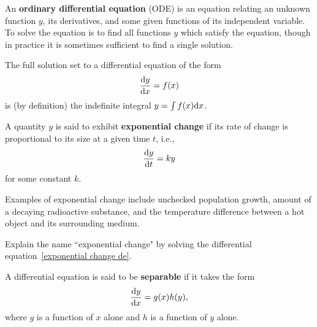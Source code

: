 

\begin{definition}
An \textbf{ordinary differential equation} (ODE) is an equation relating an unknown function $y$, its derivatives, and some given functions of its independent variable.
To solve the equation is to find all functions $y$ which satisfy the equation, though in practice it is sometimes sufficient to find a single solution.
\end{definition}

\begin{remark}
The full solution set to a differential equation of the form
\begin{equation*}
\frac{\mathrm{d} y}{\mathrm{d} x} = f(x)
\end{equation*}
is (by definition) the indefinite integral $y = \int f(x)\mathrm{d} x$.
\end{remark}

\begin{definition}
A quantity $y$ is said to exhibit \textbf{exponential change} if its rate of change is proportional to its size at a given time $t$, i.e., 
\begin{equation}\label{exponential change de}
\frac{\mathrm{d} y}{\mathrm{d} t} = ky
\end{equation}
for some constant $k$.
\end{definition}

\begin{remark}
Examples of exponential change include unchecked population growth, amount of a decaying radioactive substance, and the temperature difference between a hot object and its surrounding medium.
\end{remark}

\begin{example}
Explain the name ``exponential change" by solving the differential equation~\eqref{exponential change de}.
\end{example}

\newpage

\begin{definition}
A differential equation is said to be \textbf{separable} if it takes the form
\begin{equation}\label{separable de}
\frac{\mathrm{d} y}{\mathrm{d} x} = g(x)h(y),
\end{equation}
where $g$ is a function of $x$ alone and $h$ is a function of $y$ alone.
\end{definition}

